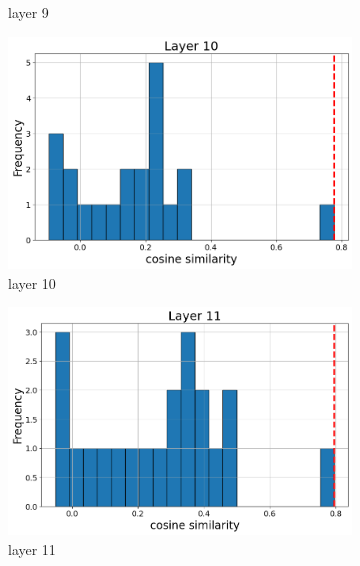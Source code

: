 \documentclass[11pt]{article}
\begin{document}
\begin{figure}[t]
\begin{subfigure}[t]{0.24\textwidth}
    \caption{layer 9}
  \end{subfigure}\hfill
    \vspace{2mm}
    
    \begin{subfigure}[t]{0.24\textwidth}
    \centering
    \includegraphics[width=1.4\columnwidth]{figures/obs2_appendix/obs2_layer10.png}
    \caption{layer 10}
  \end{subfigure}\hfill
    \begin{subfigure}[t]{0.24\textwidth}
    \centering
    \includegraphics[width=1.4\columnwidth]{figures/obs2_appendix/obs2_layer11.png}
    \caption{layer 11}
  \end{subfigure}\hfill
  \begin{subfigure}[t]{0.24\textwidth}
    \centering

\end{subfigure}
\end{figure}
\end{document}
